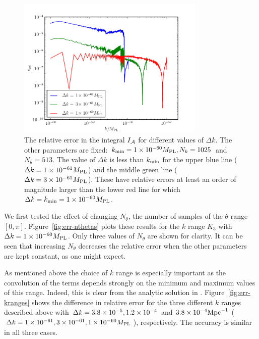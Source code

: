 \begin{figure}[htbp]
 \centering
 \includegraphics[width=0.8\textwidth]{numerical/graphs/err_deltaks-large}
 \caption[Relative Error in $I_\A$ for Different $\Delta k$]{The relative error in
the
integral $I_\A$ for different values of $\Delta k$.
The other parameters are fixed: $k_{\mathrm{min}}=1\times10^{-60}M_{\mathrm{PL}}, N_k = 1025$ and
$N_\theta=513$. 
The value of $\Delta k$ is less than $k_{\mathrm{min}}$ for the upper 
blue line ($\Delta k=1\times 10^{-61}M_{\mathrm{PL}}$) and the middle green line ($\Delta
k=3\times 10^{-61}M_{\mathrm{PL}}$). These have relative errors at least an order of magnitude larger
than the lower red line for which $\Delta k=k_{\mathrm{min}}=1\times 10^{-60}M_{\mathrm{PL}}$.}
 \label{fig:err-deltaks}
\end{figure}


We first tested the effect of changing $N_\theta$, the number of
samples of the $\theta$ range $[0,\pi]$.  Figure~\ref{fig:err-nthetas}
plots these results for the $k$ range $K_3$ with $\Delta k =
1\times 10^{-60}M_{\mathrm{PL}}$. Only three values of $N_\theta$ are shown for clarity. It
can be seen that increasing $N_\theta$ decreases the relative error when the other
parameters are kept constant, as one
might expect.


As mentioned above the choice of $k$ range is especially important as
the convolution of the terms depends strongly on the minimum and
maximum values of this range. Indeed, this is clear from the analytic
solution in . Figure~\ref{fig:err-kranges}
shows the difference in relative error for the three different $k$
ranges described above with 
$\Delta k= 3.8\times 10^{-5}, 1.2\times 10^{-4}$ and $3.8\times 10^{-4}\mathrm{Mpc}^{-1}$
($\Delta k= 1\times 10^{-61}, 3\times 10^{-61},1\times 10^{-60}M_{\mathrm{PL}}$),
respectively. The accuracy is similar in all three cases.


